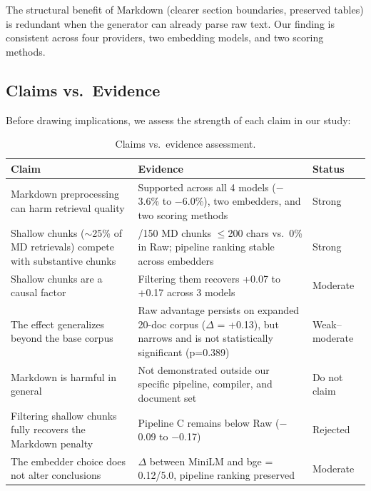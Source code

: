 \documentclass{article}
\begin{document}
The structural benefit of Markdown (clearer section boundaries, preserved tables) is redundant when the generator can already parse raw text. Our finding is consistent across four providers, two embedding models, and two scoring methods.

\subsection{Claims vs.\ Evidence}

Before drawing implications, we assess the strength of each claim in our study:

\begin{table}[h]
    \centering
    \small
    \caption{Claims vs.\ evidence assessment.}
    \label{tab:claims}
    \begin{tabular}{>{\raggedright\arraybackslash}p{3.5cm}>{\raggedright\arraybackslash}p{7cm}>{\raggedright\arraybackslash}p{2.5cm}}
        \toprule
        Claim & Evidence & Status \\
        \midrule
        Markdown preprocessing can harm retrieval quality
        & Supported across all 4 models ($-$3.6\% to $-$6.0\%), two embedders, and two scoring methods
        & Strong \\
        Shallow chunks ($\sim$25\% of MD retrievals) compete with substantive chunks
        & 38/150 MD chunks $\leq$200 chars vs.\ 0\% in Raw; pipeline ranking stable across embedders
        & Strong \\
        Shallow chunks are a causal factor
        & Filtering them recovers +0.07 to +0.17 across 3 models
        & Moderate \\
        The effect generalizes beyond the base corpus
        & Raw advantage persists on expanded 20-doc corpus ($\Delta$ = +0.13), but narrows and is not statistically significant (p=0.389)
        & Weak--moderate \\
        Markdown is harmful in general
        & Not demonstrated outside our specific pipeline, compiler, and document set
        & Do not claim \\
        Filtering shallow chunks fully recovers the Markdown penalty
        & Pipeline C remains below Raw ($-$0.09 to $-$0.17)
        & Rejected \\
        The embedder choice does not alter conclusions
        & $\Delta$ between MiniLM and bge = 0.12/5.0, pipeline ranking preserved
        & Moderate \\
        \bottomrule
    \end{tabular}
\end{table}
\end{document}
